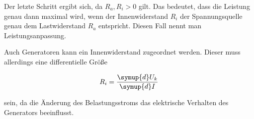 Der letzte Schritt ergibt sich, da $R_a, R_i > 0$ gilt. Das bedeutet, dass
die Leistung genau dann maximal wird, wenn der Innenwiderstand $R_i$ der 
Spannungsquelle genau dem Lastwiderstand $R_a$ entspricht. Diesen Fall
nennt man Leistungsanpassung. 

Auch Generatoren kann ein Innenwiderstand zugeordnet werden. Dieser muss
allerdings eine differentielle Größe 

\begin{equation}
R_i = \frac{\symup{d}U_k}{\symup{d} I}
\end{equation}

sein, da die Änderung des Belastungsstroms das elektrische Verhalten des 
Generators beeinflusst. 

\cite{sample}
